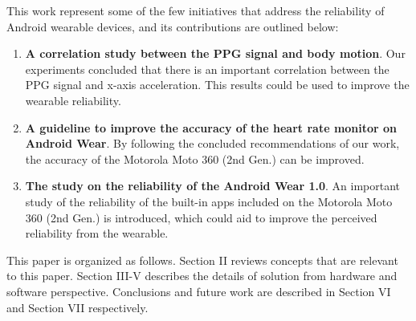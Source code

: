 \documentclass[11pt, draftclsnofoot, onecolumn]{IEEEtran}
\begin{document}
    This work represent some of the few initiatives that address the reliability of Android wearable devices, and its contributions are outlined below:
    
    \begin{enumerate}
    \item \textbf{A correlation study between the PPG signal and body motion}. Our experiments concluded that there is an important correlation between the PPG signal and x-axis acceleration. This results could be used to improve the wearable reliability.
    \item \textbf{A guideline to improve the accuracy of the heart rate monitor on Android Wear}. By following the concluded recommendations of our work, the accuracy of the Motorola Moto 360 (2nd Gen.) can be improved. 
    \item \textbf{The study on the reliability of the Android Wear 1.0}. An important study of the reliability of the built-in apps included on the Motorola Moto 360 (2nd Gen.) is introduced, which could aid to improve the perceived reliability from the wearable.
    \end{enumerate}
    
    This paper is organized as follows. Section II reviews concepts that are relevant to this paper. Section III-V describes the details of solution from hardware and software perspective. Conclusions and future work are described in Section VI and Section VII respectively.
    
	
	
	
	
\end{document}
